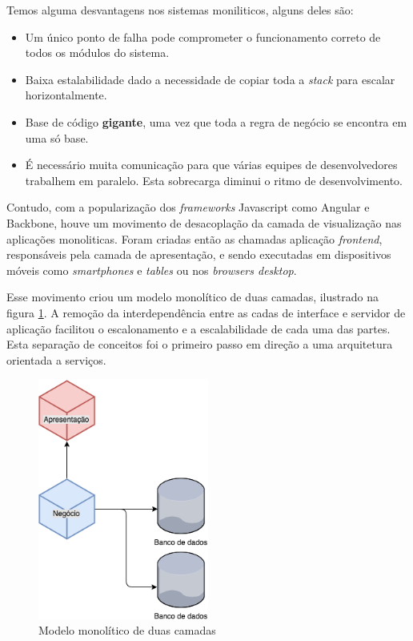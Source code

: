 Temos alguma desvantagens nos sistemas moniliticos, alguns deles são: 

\begin{itemize}
    \item Um único ponto de falha pode comprometer o funcionamento correto de todos os módulos do sistema.
    \item Baixa estalabilidade dado a necessidade de copiar toda a \textit{stack} para escalar horizontalmente.
    \item Base de código \textbf{gigante}, uma vez que toda a regra de negócio se encontra em uma só base.
    \item É necessário muita comunicação para que várias equipes de desenvolvedores trabalhem em paralelo. Esta sobrecarga diminui o ritmo de desenvolvimento.
\end{itemize}

Contudo, com a popularização dos \textit{frameworks} Javascript como Angular e Backbone, houve um movimento de desacoplação da camada de visualização nas aplicações monoliticas. Foram criadas então as chamadas aplicação \textit{frontend}, responsáveis pela camada de apresentação, e sendo executadas em dispositivos móveis como \textit{smartphones} e \textit{tables} ou nos \textit{browsers desktop}. 

Esse movimento criou um modelo monolítico de duas camadas, ilustrado na figura \ref{fig:two-tier-monolithic}. A remoção da interdependência entre as cadas de interface e servidor de aplicação facilitou o escalonamento e a escalabilidade de cada uma das partes. Esta separação de conceitos foi o primeiro passo em direção a uma arquitetura orientada a serviços.

\begin{figure}[ht]
    \centering
    \includegraphics[width=0.5\textwidth]{figuras/two-tier-monolithic.png}
    \caption{Modelo monolítico de duas camadas}
    \label{fig:two-tier-monolithic}
\end{figure}


